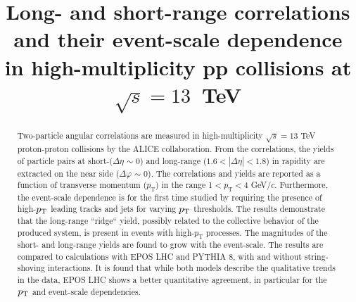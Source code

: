 \documentclass[ALICE,manyauthors]{cernphprep}
\begin{document}
\begin{titlepage}

\PHyear{}
\PHdate{\today}
%

\title{Long- and short-range correlations and their event-scale dependence in high-multiplicity pp collisions at $\sqrt{s} = 13$~TeV}


\begin{abstract}
%
Two-particle angular correlations are measured in high-multiplicity $\sqrt{s} =13$ TeV proton-proton collisions by the ALICE collaboration. From the correlations, the yields of particle pairs at short-($\Delta\eta$ $\sim$ 0) and long-range ($1.6 < |\Delta\eta| < 1.8$) in rapidity are extracted on the near side ($\Delta\varphi$ $\sim$ 0).
The correlations and yields are reported as a function of transverse momentum ($p_{\mathrm T}$) in the range 1$ < p_{\mathrm T} < $4 GeV/$c$.
Furthermore, the event-scale dependence is for the first time studied by requiring the presence of high-$p_{\rm T}$ leading tracks and jets for varying $p_{\rm T}$ thresholds. 
The results demonstrate that the long-range ``ridge`` yield, possibly related to the collective behavior of the produced system, is present in events with high-$p_{\mathrm T}$ processes. The magnitudes of the short- and long-range yields are found to grow with the event-scale. 
The results are compared to calculations with EPOS LHC and PYTHIA 8, with and without string-shoving interactions. It is found that while both models describe the qualitative trends in the data, EPOS LHC shows a better quantitative agreement, in particular for the $p_{\rm T}$ and event-scale dependencies.


\end{abstract}
\end{titlepage}
\end{document}
